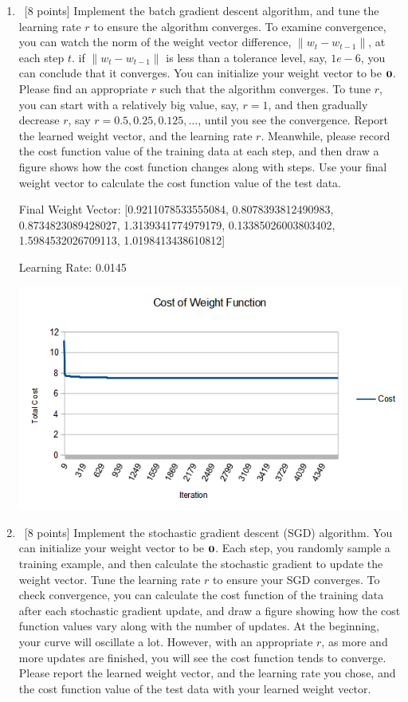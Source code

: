 \documentclass[12pt, fullpage,letterpaper]{article}
\begin{document}
\begin{enumerate}
	\begin{enumerate}
		\item~[8 points] Implement the batch gradient descent algorithm, and tune the learning rate $r$ to ensure the algorithm converges.  To examine convergence, you can watch the norm of the weight vector difference,  $\|w_{t} - w_{t-1}\|$,  at each step $t$.  if $\|w_{t} - w_{t-1}\|$ is  less than a tolerance level, say, $1e-6$, you can conclude that it converges. You can initialize your weight vector to be ${\bf 0}$.  Please find an appropriate $r$ such that the algorithm converges. To tune $r$, you can start with a relatively big value, say, $r=1$, and then gradually decrease $r$, say $r=0.5, 0.25, 0.125, \ldots$, until you see the convergence. 
		Report the learned weight vector, and the learning rate $r$. Meanwhile, please record the cost function  value of the training data at each step, and then draw a figure shows how the cost function changes along with steps. Use your final weight vector to calculate  the cost function value of the test data. 
		
		\bigskip
		
		Final Weight Vector: [0.9211078533555084, 0.8078393812490983, 0.8734823089428027, 1.3139341774979179, 0.13385026003803402, 1.5984532026709113, 1.0198413438610812]
		
		Learning Rate: 0.0145
		
		\includegraphics{batch_graph}
		
		\item~[8 points] Implement the stochastic gradient descent (SGD) algorithm. You can initialize your weight vector to be ${\bf 0}$. Each step, you randomly sample a training example, and then calculate the stochastic gradient to update the weight vector.  Tune the learning rate $r$ to ensure your SGD converges. To check convergence, you can calculate the cost function of the training data after each stochastic gradient update, and draw a figure showing how the cost function values vary along with the number of updates. At the beginning, your curve will oscillate a lot. However, with an appropriate $r$, as more and more updates are finished, you will see the cost function tends to converge. Please report the learned weight vector, and the learning rate you chose, and the cost function value of the test data with your learned weight vector.
				

\end{enumerate}
\end{enumerate}
\end{document}
